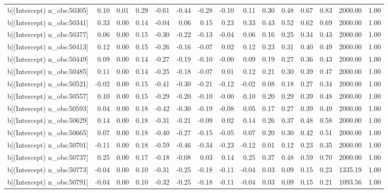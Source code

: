 \begin{table}[ht]
\begin{tabular}{rrrrrrrrrrrrrrr}
  b[(Intercept) n\_obs:50305] & 0.10 & 0.01 & 0.29 & -0.61 & -0.44 & -0.28 & -0.10 & 0.11 & 0.30 & 0.48 & 0.67 & 0.83 & 2000.00 & 1.00 \\ 
  b[(Intercept) n\_obs:50341] & 0.33 & 0.00 & 0.14 & -0.04 & 0.06 & 0.15 & 0.23 & 0.33 & 0.43 & 0.52 & 0.62 & 0.69 & 2000.00 & 1.00 \\ 
  b[(Intercept) n\_obs:50377] & 0.06 & 0.00 & 0.15 & -0.30 & -0.22 & -0.13 & -0.04 & 0.06 & 0.16 & 0.25 & 0.34 & 0.43 & 2000.00 & 1.00 \\ 
  b[(Intercept) n\_obs:50413] & 0.12 & 0.00 & 0.15 & -0.26 & -0.16 & -0.07 & 0.02 & 0.12 & 0.23 & 0.31 & 0.40 & 0.49 & 2000.00 & 1.00 \\ 
  b[(Intercept) n\_obs:50449] & 0.09 & 0.00 & 0.14 & -0.27 & -0.19 & -0.10 & -0.00 & 0.09 & 0.19 & 0.27 & 0.36 & 0.43 & 2000.00 & 1.00 \\ 
  b[(Intercept) n\_obs:50485] & 0.11 & 0.00 & 0.14 & -0.25 & -0.18 & -0.07 & 0.01 & 0.12 & 0.21 & 0.30 & 0.39 & 0.47 & 2000.00 & 1.00 \\ 
  b[(Intercept) n\_obs:50521] & -0.02 & 0.00 & 0.15 & -0.41 & -0.30 & -0.21 & -0.12 & -0.02 & 0.08 & 0.18 & 0.27 & 0.34 & 2000.00 & 1.00 \\ 
  b[(Intercept) n\_obs:50557] & 0.10 & 0.00 & 0.15 & -0.29 & -0.20 & -0.10 & -0.00 & 0.10 & 0.20 & 0.29 & 0.39 & 0.48 & 2000.00 & 1.00 \\ 
  b[(Intercept) n\_obs:50593] & 0.04 & 0.00 & 0.18 & -0.42 & -0.30 & -0.19 & -0.08 & 0.05 & 0.17 & 0.27 & 0.39 & 0.49 & 2000.00 & 1.00 \\ 
  b[(Intercept) n\_obs:50629] & 0.14 & 0.00 & 0.18 & -0.31 & -0.21 & -0.09 & 0.02 & 0.14 & 0.26 & 0.37 & 0.48 & 0.58 & 2000.00 & 1.00 \\ 
  b[(Intercept) n\_obs:50665] & 0.07 & 0.00 & 0.18 & -0.40 & -0.27 & -0.15 & -0.05 & 0.07 & 0.20 & 0.30 & 0.42 & 0.51 & 2000.00 & 1.00 \\ 
  b[(Intercept) n\_obs:50701] & -0.11 & 0.00 & 0.18 & -0.59 & -0.46 & -0.34 & -0.23 & -0.12 & 0.01 & 0.12 & 0.23 & 0.35 & 2000.00 & 1.00 \\ 
  b[(Intercept) n\_obs:50737] & 0.25 & 0.00 & 0.17 & -0.18 & -0.08 & 0.03 & 0.14 & 0.25 & 0.37 & 0.48 & 0.59 & 0.70 & 2000.00 & 1.00 \\ 
  b[(Intercept) n\_obs:50773] & -0.04 & 0.00 & 0.10 & -0.31 & -0.25 & -0.18 & -0.11 & -0.04 & 0.03 & 0.09 & 0.15 & 0.23 & 1335.19 & 1.00 \\ 
  b[(Intercept) n\_obs:50791] & -0.04 & 0.00 & 0.10 & -0.32 & -0.25 & -0.18 & -0.11 & -0.04 & 0.03 & 0.09 & 0.15 & 0.21 & 1093.56 & 1.00 \\ 

\end{tabular}
\end{table}
